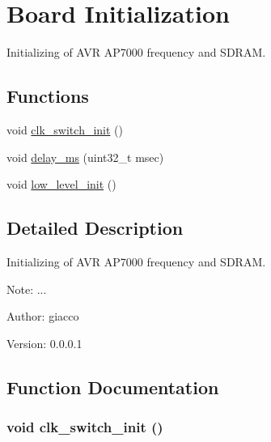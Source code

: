 \hypertarget{group___i_n_i_t}{
\section{Board Initialization}
\label{group___i_n_i_t}
}
Initializing of AVR AP7000 frequency and SDRAM.  


\subsection*{Functions}
\begin{CompactItemize}
\item 
void \hyperlink{group___i_n_i_t_gf9f36810319b49c737370f718896e171}{clk\_\-switch\_\-init} ()
\item 
void \hyperlink{group___i_n_i_t_g0a52093f3e803fcb07aeb961756c9961}{delay\_\-ms} (uint32\_\-t msec)
\item 
void \hyperlink{group___i_n_i_t_gb5cd55a9a8526924bbc0f65b024972ad}{low\_\-level\_\-init} ()
\end{CompactItemize}


\subsection{Detailed Description}
Initializing of AVR AP7000 frequency and SDRAM. 

\begin{Desc}
\item[Note:]... \end{Desc}
\begin{Desc}
\item[Author:]giacco \end{Desc}
\begin{Desc}
\item[Version:]0.0.0.1 \end{Desc}


\subsection{Function Documentation}
\hypertarget{group___i_n_i_t_gf9f36810319b49c737370f718896e171}{
\subsubsection[{clk\_\-switch\_\-init}]{\setlength{\rightskip}{0pt plus 5cm}void clk\_\-switch\_\-init ()}}
\label{group___i_n_i_t_gf9f36810319b49c737370f718896e171}


